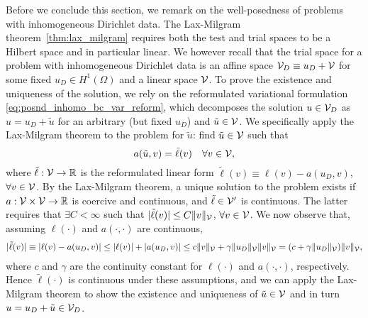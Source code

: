 Before we conclude this section, we remark on the well-posedness of problems with inhomogeneous Dirichlet data.  The Lax-Milgram theorem~\ref{thm:lax_milgram} requires both the test and trial spaces to be a Hilbert space and in particular linear. We however recall that the trial space for a problem with inhomogeneous Dirichlet data is an affine space $\mathcal{V}_D \equiv u_D + \mathcal{V}$ for some fixed $u_D \in H^1(\Omega)$ and a linear space $\mathcal{V}$. To prove the existence and uniqueness of the solution, we rely on the reformulated variational formulation \eqref{eq:posnd_inhomo_bc_var_reform}, which decomposes the solution $u \in \mathcal{V}_D$ as $u = u_D + \tilde u$ for an arbitrary (but fixed $u_D$) and $\tilde u \in \mathcal{V}$.  We specifically apply the Lax-Milgram theorem to the problem for $\tilde u$: find $\tilde u \in \mathcal{V}$ such that
  \begin{equation*}
    a(\tilde u, v) = \tilde \ell(v) \quad \forall v \in \mathcal{V},
  \end{equation*}
  where $\tilde \ell: \mathcal{V} \to \mathbb{R}$ is the reformulated linear form $\tilde \ell(v) \equiv \ell(v) - a(u_D,v)$, $\forall v \in \mathcal{V}$. By the Lax-Milgram theorem, a unique solution to the problem exists if $a:\mathcal{V} \times \mathcal{V} \to \mathbb{R}$ is coercive and continuous, and $\tilde \ell \in \mathcal{V}'$ is continuous. The latter requires that $\exists C < \infty$ such that $|\tilde \ell(v)| \leq C\| v \|_{\mathcal{V}}$, $\forall v \in \mathcal{V}$.  We now observe that, assuming $\ell(\cdot)$ and $a(\cdot,\cdot)$ are continuous, 
  \begin{align*}
    | \tilde \ell(v) | \equiv | \ell(v) - a(u_D,v) |
    \leq | \ell(v) | + | a(u_D,v) |
    \leq c \| v \|_{\mathcal{V}} + \gamma \| u_D \|_{\mathcal{V}} \| v \|_{\mathcal{V}}
    = (c + \gamma \| u_D \|_{\mathcal{V}}) \| v \|_{\mathcal{V}},
  \end{align*}
  where $c$ and $\gamma$ are the continuity constant for $\ell(\cdot)$ and $a(\cdot,\cdot)$, respectively.  Hence $\tilde \ell(\cdot)$ is continuous under these assumptions, and we can apply the Lax-Milgram theorem to show the existence and uniqueness of $\tilde u \in \mathcal{V}$ and in turn $u = u_D + \tilde u \in \mathcal{V}_D$.

